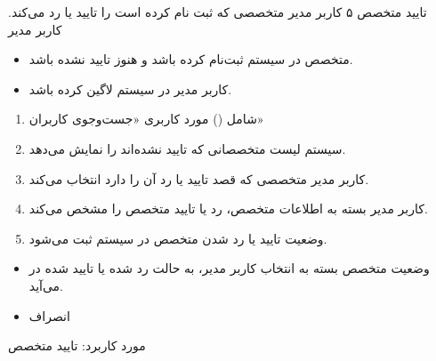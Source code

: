 {
\usecase
{تایید متخصص}
{۵}
{کاربر مدیر متخصصی که ثبت نام کرده است را تایید یا رد می‌کند.}
{کاربر مدیر}
{}
{
	\begin{itemize}
	\item 
متخصص در سیستم ثبت‌نام کرده باشد و هنوز تایید نشده باشد.
	
	\item
کاربر مدیر در سیستم لاگین کرده باشد.
\end{itemize}
}
{
\begin{enumerate}
	\item 
	شامل () مورد کاربری «جست‌وجوی کاربران»
	\item
	سیستم لیست متخصصانی که تایید نشده‌اند را نمایش می‌دهد.
	
	\item 
کاربر مدیر متخصصی که قصد تایید یا رد آن را دارد انتخاب می‌کند.
	
	\item 
کاربر مدیر بسته به اطلاعات متخصص، رد یا تایید متخصص را مشخص می‌کند.
\item 
وضعیت تایید یا رد شدن متخصص در سیستم ثبت می‌شود.
\end{enumerate}
}
{\begin{itemize}
	\item
	وضعیت متخصص بسته به انتخاب کاربر مدیر، به حالت رد شده یا تایید شده در می‌آید.
\end{itemize}}
{
\begin{itemize}
	\item
	 انصراف
\end{itemize}
}
{مورد کاربرد: تایید متخصص}




}

